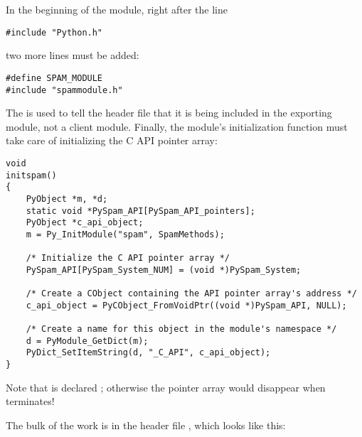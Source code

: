 \documentclass{manual}
\begin{document}
In the beginning of the module, right after the line
\begin{verbatim}
#include "Python.h"
\end{verbatim}
two more lines must be added:
\begin{verbatim}
#define SPAM_MODULE
#include "spammodule.h"
\end{verbatim}

The  is used to tell the header file that it is being
included in the exporting module, not a client module. Finally,
the module's initialization function must take care of initializing
the C API pointer array:
\begin{verbatim}
void
initspam()
{
    PyObject *m, *d;
    static void *PySpam_API[PySpam_API_pointers];
    PyObject *c_api_object;
    m = Py_InitModule("spam", SpamMethods);

    /* Initialize the C API pointer array */
    PySpam_API[PySpam_System_NUM] = (void *)PySpam_System;

    /* Create a CObject containing the API pointer array's address */
    c_api_object = PyCObject_FromVoidPtr((void *)PySpam_API, NULL);

    /* Create a name for this object in the module's namespace */
    d = PyModule_GetDict(m);
    PyDict_SetItemString(d, "_C_API", c_api_object);
}
\end{verbatim}

Note that  is declared ; otherwise
the pointer array would disappear when  terminates!

The bulk of the work is in the header file ,
which looks like this:
\end{document}
